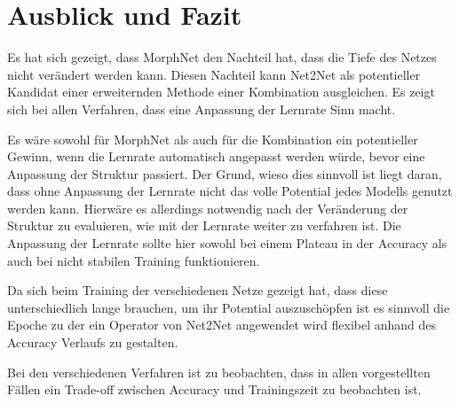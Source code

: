 
\chapter{Ausblick und Fazit}\label{sec:fazit}

Es hat sich gezeigt, dass MorphNet den Nachteil hat, dass die Tiefe des Netzes nicht verändert werden kann. Diesen Nachteil kann Net2Net als potentieller Kandidat einer erweiternden Methode einer Kombination ausgleichen. Es zeigt sich bei allen Verfahren, dass eine Anpassung der Lernrate Sinn macht. 

Es wäre sowohl für MorphNet als auch für die Kombination ein potentieller Gewinn, wenn die Lernrate automatisch angepasst werden würde, bevor eine Anpassung der Struktur passiert. Der Grund, wieso dies sinnvoll ist liegt daran, dass ohne Anpassung der Lernrate nicht das volle Potential jedes Modells genutzt werden kann. Hierwäre es allerdings notwendig nach der Veränderung der Struktur zu evaluieren, wie mit der Lernrate weiter zu verfahren ist. Die Anpassung der Lernrate sollte hier sowohl bei einem Plateau in der Accuracy als auch bei nicht stabilen Training funktionieren.


Da sich beim Training der verschiedenen Netze gezeigt hat, dass diese unterschiedlich lange brauchen, um ihr Potential auszuschöpfen ist es sinnvoll die Epoche zu der ein Operator von Net2Net angewendet wird flexibel anhand des Accuracy Verlaufs zu gestalten.  




Bei den verschiedenen Verfahren ist zu beobachten, dass in allen vorgestellten Fällen ein Trade-off zwischen Accuracy und Trainingszeit zu beobachten ist.
